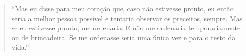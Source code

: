 

\cleartoverso

\begin{quote}
“Mas eu disse para meu coração que, caso não estivesse pronto, eu então
seria a melhor pessoa possível e tentaria observar os preceitos,
sempre. Mas se eu estivesse pronto, me ordenaria. E não me ordenaria
temporariamente ou de brincadeira. Se me ordenasse seria uma única vez
e para o resto da vida.”
\end{quote}

